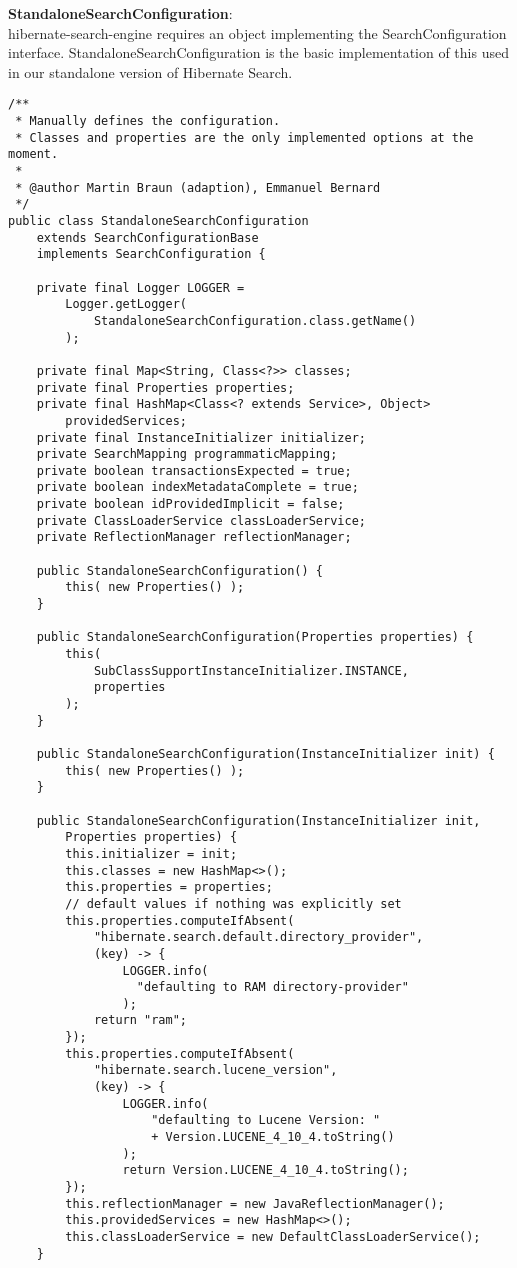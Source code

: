 \pagebreak

\noindent
\textbf{StandaloneSearchConfiguration}:\\
hibernate-search-engine requires an object implementing the SearchConfiguration interface. StandaloneSearchConfiguration is the basic implementation of this used in our standalone version of Hibernate Search.
\\
\lstset{language=java}
\begin{lstlisting}[frame=htrbl, caption={StandaloneSearchConfiguration.java}, label={lst:StandaloneSearchConfiguration.java}]
/**
 * Manually defines the configuration. 
 * Classes and properties are the only implemented options at the moment.
 *
 * @author Martin Braun (adaption), Emmanuel Bernard
 */
public class StandaloneSearchConfiguration 
	extends SearchConfigurationBase 
	implements SearchConfiguration {

	private final Logger LOGGER = 
		Logger.getLogger( 
			StandaloneSearchConfiguration.class.getName() 
		);
		
	private final Map<String, Class<?>> classes;
	private final Properties properties;
	private final HashMap<Class<? extends Service>, Object> 
		providedServices;
	private final InstanceInitializer initializer;
	private SearchMapping programmaticMapping;
	private boolean transactionsExpected = true;
	private boolean indexMetadataComplete = true;
	private boolean idProvidedImplicit = false;
	private ClassLoaderService classLoaderService;
	private ReflectionManager reflectionManager;

	public StandaloneSearchConfiguration() {
		this( new Properties() );
	}

	public StandaloneSearchConfiguration(Properties properties) {
		this( 
			SubClassSupportInstanceInitializer.INSTANCE, 
			properties
		);
	}

	public StandaloneSearchConfiguration(InstanceInitializer init) {
		this( new Properties() );
	}

	public StandaloneSearchConfiguration(InstanceInitializer init, 
		Properties properties) {
		this.initializer = init;
		this.classes = new HashMap<>();
		this.properties = properties;
		// default values if nothing was explicitly set
		this.properties.computeIfAbsent(
			"hibernate.search.default.directory_provider", 
			(key) -> {
				LOGGER.info( 
				  "defaulting to RAM directory-provider" 
				);
			return "ram";
		});
		this.properties.computeIfAbsent(
			"hibernate.search.lucene_version", 
			(key) -> {
				LOGGER.info( 
					"defaulting to Lucene Version: " 
					+ Version.LUCENE_4_10_4.toString() 
				);
				return Version.LUCENE_4_10_4.toString();
		});
		this.reflectionManager = new JavaReflectionManager();
		this.providedServices = new HashMap<>();
		this.classLoaderService = new DefaultClassLoaderService();
	}


\end{lstlisting}
